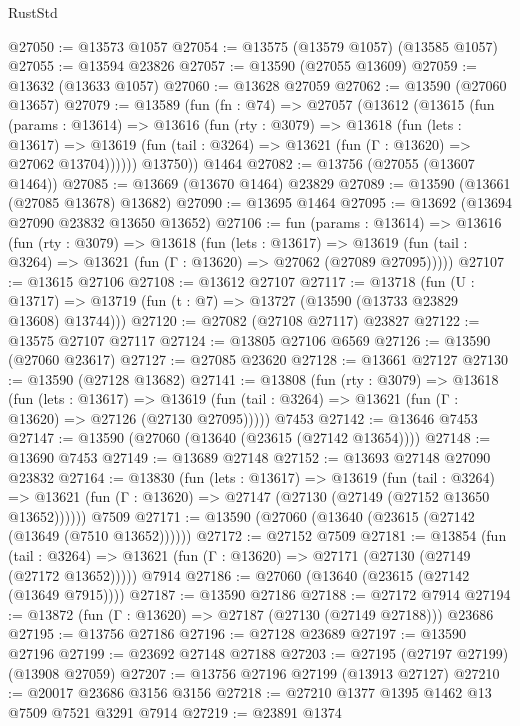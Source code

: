 \begin{lexlean}{RustStd}
\begin{coremodule}
@27050 := @13573 @1057
@27054 := @13575 (@13579 @1057) (@13585 @1057)
@27055 := @13594 @23826
@27057 := @13590 (@27055 @13609)
@27059 := @13632 (@13633 @1057)
@27060 := @13628 @27059
@27062 := @13590 (@27060 @13657)
@27079 := @13589
    (fun (fn : @74) =>
    @27057
      (@13612
        (@13615
          (fun (params : @13614) =>
          @13616
            (fun (rty : @3079) =>
            @13618
              (fun (lets : @13617) =>
              @13619 (fun (tail : @3264) => @13621 (fun (Γ : @13620) => @27062 @13704))))))
        @13750))
    @1464
@27082 := @13756 (@27055 (@13607 @1464))
@27085 := @13669 (@13670 @1464) @23829
@27089 := @13590 (@13661 (@27085 @13678) @13682)
@27090 := @13695 @1464
@27095 := @13692 (@13694 @27090 @23832 @13650 @13652)
@27106 := fun (params : @13614) =>
  @13616
    (fun (rty : @3079) =>
    @13618
      (fun (lets : @13617) =>
      @13619 (fun (tail : @3264) => @13621 (fun (Γ : @13620) => @27062 (@27089 @27095)))))
@27107 := @13615 @27106
@27108 := @13612 @27107
@27117 := @13718
    (fun (U : @13717) => @13719 (fun (t : @7) => @13727 (@13590 (@13733 @23829 @13608) @13744)))
@27120 := @27082 (@27108 @27117) @23827
@27122 := @13575 @27107 @27117
@27124 := @13805 @27106 @6569
@27126 := @13590 (@27060 @23617)
@27127 := @27085 @23620
@27128 := @13661 @27127
@27130 := @13590 (@27128 @13682)
@27141 := @13808
    (fun (rty : @3079) =>
    @13618
      (fun (lets : @13617) =>
      @13619 (fun (tail : @3264) => @13621 (fun (Γ : @13620) => @27126 (@27130 @27095)))))
    @7453
@27142 := @13646 @7453
@27147 := @13590 (@27060 (@13640 (@23615 (@27142 @13654))))
@27148 := @13690 @7453
@27149 := @13689 @27148
@27152 := @13693 @27148 @27090 @23832
@27164 := @13830
    (fun (lets : @13617) =>
    @13619
      (fun (tail : @3264) =>
      @13621 (fun (Γ : @13620) => @27147 (@27130 (@27149 (@27152 @13650 @13652))))))
    @7509
@27171 := @13590 (@27060 (@13640 (@23615 (@27142 (@13649 (@7510 @13652))))))
@27172 := @27152 @7509
@27181 := @13854
    (fun (tail : @3264) => @13621 (fun (Γ : @13620) => @27171 (@27130 (@27149 (@27172 @13652)))))
    @7914
@27186 := @27060 (@13640 (@23615 (@27142 (@13649 @7915))))
@27187 := @13590 @27186
@27188 := @27172 @7914
@27194 := @13872 (fun (Γ : @13620) => @27187 (@27130 (@27149 @27188))) @23686
@27195 := @13756 @27186
@27196 := @27128 @23689
@27197 := @13590 @27196
@27199 := @23692 @27148 @27188
@27203 := @27195 (@27197 @27199) (@13908 @27059)
@27207 := @13756 @27196 @27199 (@13913 @27127)
@27210 := @20017 @23686 @3156 @3156
@27218 := @27210 @1377 @1395 @1462 @13 @7509 @7521 @3291 @7914
@27219 := @23891 @1374

\end{coremodule}
\end{lexlean}

